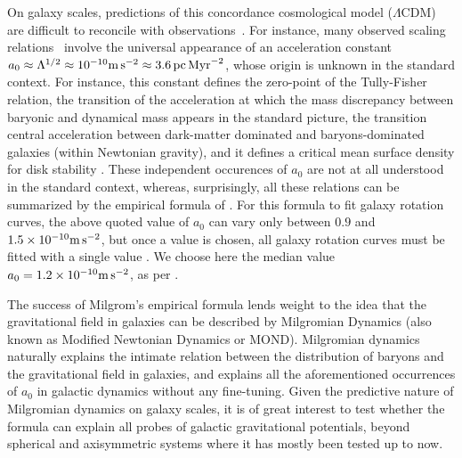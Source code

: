 \documentclass[useAMS,usenatbib]{mn2e}
\begin{document}
On galaxy scales, predictions of this concordance cosmological model ($\Lambda$CDM) are difficult to reconcile with observations~\citep{Disney08, Peebles, Kroupa1, Kroupa2, KroupaPawlowskiMilgrom2013}. For instance, many observed scaling relations~\citep[see][for a review]{FamMcgaugh} involve the universal appearance of an acceleration constant $a_0 
	\approx \Lambda^{1/2} 
	\approx 10^{-10}{\rm m} \, {\rm s}^{-2} 
	\approx 3.6\,\text{pc}\,\text{Myr}^{-2}
$, whose origin is unknown in the standard context. 
For instance, this constant defines the zero-point of the Tully-Fisher relation, the transition of the acceleration at which the mass discrepancy between baryonic and dynamical mass appears in the standard picture, the transition central acceleration between dark-matter dominated and baryons-dominated galaxies (within Newtonian gravity), and it defines a critical mean surface density for disk stability \citep{FamMcgaugh}. These independent occurences of $a_0$ are not at all understood in the standard context, whereas, surprisingly, all these relations can be summarized by the empirical formula of \citet{Mil83}. For this formula to fit galaxy rotation curves, the above quoted value of $a_0$ can vary only between $0.9$ and $1.5 \times 10^{-10}{\rm m} \, {\rm s}^{-2}$,  but once a value is chosen, all galaxy rotation curves must be fitted with a single value \citep{things}. We choose here the median value $a_0=1.2 \times 10^{-10}{\rm m} \, {\rm s}^{-2}$, as per \citet{things}.

The success of Milgrom's empirical formula lends weight to the idea that the gravitational field in galaxies can be described by Milgromian Dynamics (also known as Modified Newtonian Dynamics or MOND). 
Milgromian dynamics naturally explains the intimate relation between the distribution of baryons and the gravitational field in galaxies, and explains all the aforementioned occurrences of $a_0$ in galactic dynamics without any fine-tuning. Given the predictive nature of Milgromian dynamics on galaxy scales,
it is of great interest to test whether the formula can explain all probes of galactic gravitational potentials, beyond spherical and axisymmetric systems where it has mostly been tested up to now.
\end{document}
